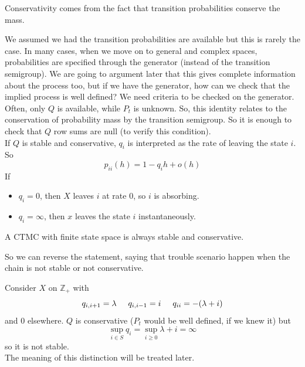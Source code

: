 \documentclass{article}
\begin{document}
\begin{remark}
    Conservativity comes from the fact that transition probabilities conserve the mass.
\end{remark}
We assumed we had the transition probabilities are available but this is rarely the case. In many cases, when we move on to general and complex spaces, probabilities are specified through the generator (instead of the transition semigroup).
We are going to argument later that this gives complete information about the process too, but if we have the generator, how can we check that the implied process is well defined? We need criteria to be checked on the generator. Often, only $Q$ is available, while $P_t$ is unknown. So, this identity relates to the conservation of probability mass by the transition semigroup. So it is enough to check that $Q$ row sums are null (to verify this condition). \\
If $Q$ is stable and conservative, $q_i$ is interpreted as the rate of leaving the state $i$. So
\begin{equation*}
    p_{ii}(h) = 1-q_i h + o(h) 
\end{equation*}
If 
\begin{itemize}
    \item $q_i = 0$, then $X$ leaves $i$ at rate $0$, so $i$ is absorbing. 
    \item $q_i = \infty$, then $x$ leaves the state $i$ instantaneously. 
\end{itemize}
    \begin{proposition}
        A CTMC with finite state space is always stable and conservative.
    \end{proposition}
    So we can reverse the statement, saying that trouble scenario happen when the chain is not stable or not  conservative.
\begin{example}
    Consider $X$ on $\mathbb{Z}_+$ with 
\begin{equation*}
    q_{i,i+1}= \lambda \hspace{0.5 cm} q_{i,i-1}= i \hspace{0.5 cm} q_{ii}= -(\lambda + i)
\end{equation*}
and $0$ elsewhere. $Q$ is conservative ($P_t$ would be well defined, if we knew it) but 
\begin{equation*}
    \sup_{i \in S} q_i = \sup_{i \geqslant 0} \lambda + i = \infty
\end{equation*}
so it is not stable. \\
The meaning of this distinction will be treated later.
\end{example}
\end{document}
